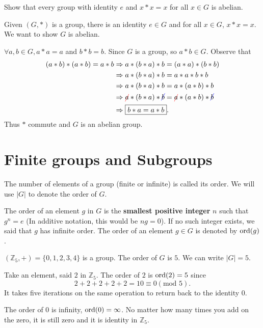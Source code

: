 \begin{example}[Tutorial]
    Show that every group with identity $e$ and $x * x = x$ for all $x \in G$ is abelian.
\end{example}
\begin{solution}
    Given $(G, *)$ is a group, there is an identity $e \in G$ and for all $x \in G$, $x * x = x$. We 
    want to show $G$ is abelian.

    $\forall a, b \in G, a * a = a$ and $b * b = b$. Since $G$ is a group, so $a * b \in G$. Observe that
    \begin{align*}
        (a * b) * (a * b) = a * b &\Rightarrow a * (b * a) * b = (a * a) * (b * b)\\
        &\Rightarrow a * (b * a) * b = a * a * b * b\\
        &\Rightarrow a * (b * a) * b = a * (a * b) * b\\
        &\Rightarrow \Cancel[red]{a} * (b * a) * \Cancel[blue]{b} = \Cancel[red]{a} * (a * b) * \Cancel[blue]{b}\\
        &\Rightarrow \fbox{$b * a = a * b$}.
    \end{align*}
    Thus $*$ commute and $G$ is an abelian group.
\end{solution}

\section{Finite groups and Subgroups}

\begin{definition}
    The number of elements of a group (finite or infinite) is called its order. We 
    will use $|G|$ to denote the order of $G$.
\end{definition}

The order of an element $g$ in $G$ is the \textbf{smallest positive integer} $n$ such that 
$g^n = e$ (In additive notation, this would be $ng = 0$). If no such integer exists, we said that 
$g$ has infinite order. The order of an element $g \in G$ is denoted 
by $\ord(g)$.

\begin{example}
    $(\mathbb{Z}_5, +) = \{0,1,2,3,4 \}$ is a group. The order of $G$ is $5$. 
    We can write $|G| = 5$. 

    Take an element, said $2$ in $\mathbb{Z}_5$. The order of $2$ is $\ord(2) = 5$ since 
    \[
        2+2+2+2+2 = 10 \equiv 0 (\text{mod } 5).
    \]
    It takes five iterations on the same operation to return back to the identity 0.

    The order of $0$ is infinity, $\ord(0) = \infty$. No matter how many times you add on the zero, 
    it is still zero and it is identity in $\mathbb{Z}_5$.
\end{example}

